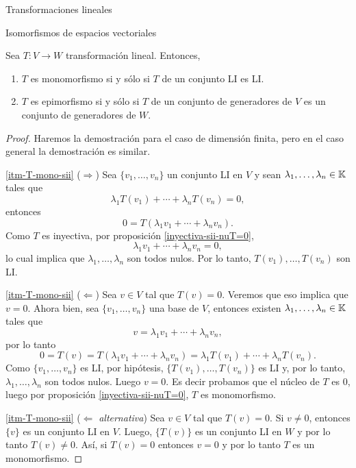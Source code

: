\begin{chapter}{Transformaciones lineales}
\begin{section}{Isomorfismos de espacios vectoriales}
        \begin{proposicion}\label{prop-T-mono-sii-li-2-li} Sea $T:V \to W$ transformación lineal. Entonces,
            \begin{enumerate}
                \item\label{itm-T-mono-sii} $T$ es monomorfismo si y sólo si $T$ de un conjunto LI  es  LI.
                \item\label{itm-T-epi-sii} $T$ es epimorfismo si y sólo si $T$ de un conjunto de generadores de $V$ es un conjunto de generadores de $W$.
            \end{enumerate}
        \end{proposicion}
        \begin{proof} Haremos la demostración para el caso de dimensión finita,  pero en el caso general la demostración es similar. 
            
        \ref{itm-T-mono-sii} ($\Rightarrow$) Sea $\{v_1,\ldots,v_n \}$ un conjunto LI en $V$ y sean  $\lambda_1,\ldots,\lambda_n \in \mathbb K$ tales que
        $$
        \lambda_1T(v_1) +\cdots+ \lambda_{n}T(v_n) =0,
        $$
        entonces
        $$
        0 = T(\lambda_1v_1+\cdots + \lambda_{n}v_n).
        $$
        Como $T$  es inyectiva, por proposición \ref{inyectiva-sii-nuT=0}, 
        $$
        \lambda_1v_1+\cdots + \lambda_{n}v_n =0,
        $$
        lo cual implica que $\lambda_1,\ldots,\lambda_n$ son todos nulos. Por lo tanto,  $T(v_1),\ldots,T(v_n)$ son LI.
        
        
        \ref{itm-T-mono-sii} ($\Leftarrow$) Sea $v \in V$ tal que $T(v)=0$. Veremos que eso implica que $v =0$.  Ahora bien, sea  $\{v_1,\ldots,v_n \}$ una base de $V$,  entonces existen $\lambda_1,\ldots,\lambda_n \in \mathbb K$ tales que
        $$
        v = \lambda_1v_1+\cdots + \lambda_{n}v_n,
        $$
        por lo tanto
        $$
        0 = T(v) = T(\lambda_1v_1+\cdots + \lambda_{n}v_n) = \lambda_1T(v_1) +\cdots+ \lambda_{n}T(v_n).
        $$
        Como $\{v_1,\ldots,v_n \}$ es LI, por hipótesis, $\{T(v_1),\ldots,T(v_n)\}$ es LI y, por lo tanto, $\lambda_1,\ldots,\lambda_n$ son todos nulos. Luego $v=0$. Es decir probamos  que el núcleo de $T$ es $0$, luego por proposición \ref{inyectiva-sii-nuT=0}, $T$ es monomorfismo. 
        
        \ref{itm-T-mono-sii} ($\Leftarrow$ \textit{alternativa}) Sea $v \in V$ tal que $T(v)=0$.	Si $v\neq 0$, entonces $\{v\}$ es un conjunto LI en $V$. Luego, $\{T(v)\}$ es un conjunto LI en $W$ y por lo tanto $T(v)\neq 0$. Así, si $T(v)=0$ entonces $v=0$ y por lo tanto $T$ es un monomorfismo.
              

\end{proof}
\end{section}
\end{chapter}
